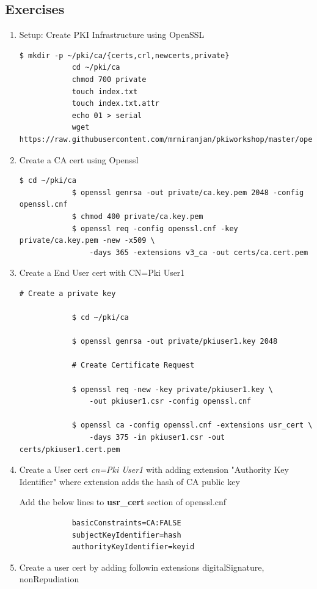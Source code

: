\documentclass[a4paper]{article}
\begin{document}
    \subsection{Exercises}
\begin{enumerate}[label*=\arabic*.]
    \item Setup: Create PKI Infrastructure using OpenSSL
        \begin{lstlisting}[style=BashInputStyle]
            $ mkdir -p ~/pki/ca/{certs,crl,newcerts,private}
            cd ~/pki/ca
            chmod 700 private
            touch index.txt
            touch index.txt.attr
            echo 01 > serial
            wget https://raw.githubusercontent.com/mrniranjan/pkiworkshop/master/openssl.cnf
        \end{lstlisting}
    \item Create a CA cert using Openssl
        \begin{lstlisting}[style=BashInputStyle]
            $ cd ~/pki/ca
            $ openssl genrsa -out private/ca.key.pem 2048 -config openssl.cnf
            $ chmod 400 private/ca.key.pem
            $ openssl req -config openssl.cnf -key private/ca.key.pem -new -x509 \
                -days 365 -extensions v3_ca -out certs/ca.cert.pem
        \end{lstlisting}
    \item Create a End User cert with CN=Pki User1
        \begin{lstlisting}[style=BashInputStyle]
            # Create a private key
            
            $ cd ~/pki/ca
            
            $ openssl genrsa -out private/pkiuser1.key 2048
            
            # Create Certificate Request

            $ openssl req -new -key private/pkiuser1.key \
                -out pkiuser1.csr -config openssl.cnf
            
            $ openssl ca -config openssl.cnf -extensions usr_cert \
                -days 375 -in pkiuser1.csr -out certs/pkiuser1.cert.pem
        \end{lstlisting}
    \item Create a User cert \textit{cn=Pki User1} with adding extension "Authority Key Identifier" where 
        extension adds the hash of CA public key

        Add the below lines to \textbf{usr\_cert} section of openssl.cnf
        \begin{lstlisting}
            basicConstraints=CA:FALSE
            subjectKeyIdentifier=hash
            authorityKeyIdentifier=keyid
        \end{lstlisting}
    \item Create a user cert by adding followin extensions digitalSignature, nonRepudiation


\end{enumerate}
\end{document}
